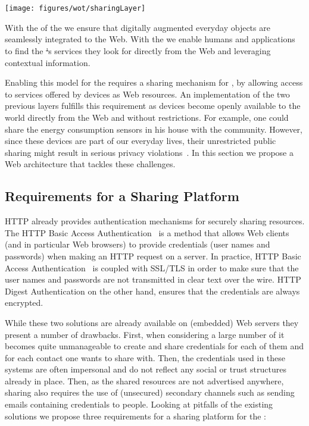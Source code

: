 \section{\shareLayer{}}\label{sharing}
\begin{center}
\texttt{[image: figures/wot/sharingLayer]}
\end{center}
With the \devLayer{} of the \WoTA{} we ensure that digitally augmented everyday objects are seamlessly integrated to the Web. With the \findLayer{} we enable humans and applications to find the \st's services they look for directly from the Web and leveraging contextual information.


Enabling this model for the \WoTLong{} requires a sharing mechanism for \sts{}, by allowing access to services offered by devices as Web resources. An implementation of the two previous layers fulfills this requirement as devices become openly available to the world directly from the Web and without restrictions. For example, one could share the energy consumption sensors in his house with the community. However, since these devices are part of our everyday lives, their unrestricted public sharing might result in serious privacy violations~\cite{Mazurek2010,Langheinrich2005}. In this section we propose a Web architecture that tackles these challenges.

\subsection{Requirements for a \WoT{} Sharing Platform}
HTTP already provides authentication mechanisms for securely sharing resources. The HTTP Basic Access Authentication~\cite{Franks1999} is a method that allows Web clients (and in particular Web browsers) to provide credentials (user names and passwords) when making an HTTP request on a server.  In practice, HTTP Basic Access Authentication~\cite{Franks1999} is coupled with SSL/TLS in order to make sure that the user names and passwords are not transmitted in clear text over the wire. HTTP Digest Authentication on the other hand, ensures that the credentials are always encrypted.

While these two solutions are already available on (embedded) Web servers they present a number of drawbacks. First, when considering a large number of \sts{} it becomes quite unmanageable to create and share credentials for each of them and for each contact one wants to share with. Then, the credentials used in these systems are often impersonal and do not reflect any social or trust structures already in place. Then, as the shared resources are not advertised anywhere, sharing also requires the use of (unsecured) secondary channels such as sending emails containing credentials to people. Looking at pitfalls of the existing solutions we propose three requirements for a sharing platform for the \WoT{}:

